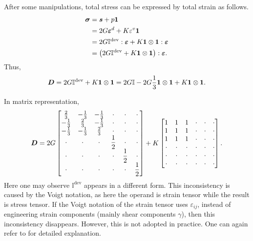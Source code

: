 After some manipulations, total stress can be expressed by total strain as follows.
\begin{gather}
\begin{split}
\bm{\sigma}&=\bm{s}+p\bm{1}\\
&=2G\bm{\varepsilon}^d+K\varepsilon^v\bm{1}\\
&=2G\mathbb{I}^\text{dev}:\bm{\varepsilon}+K\bm{1}\otimes\bm{1}:\bm{\varepsilon}\\
&=\left(2G\mathbb{I}^\text{dev}+K\bm{1}\otimes\bm{1}\right):\bm{\varepsilon}.
\end{split}
\end{gather}
Thus,
\begin{gather}
\bm{D}=2G\mathbb{I}^\text{dev}+K\bm{1}\otimes\bm{1}=2G\mathbb{I}-2G\dfrac{1}{3}\bm{1}\otimes\bm{1}+K\bm{1}\otimes\bm{1}.
\end{gather}

In matrix representation,
\begin{gather}
\bm{D}=2G\begin{bmatrix}
\frac{2}{3}&-\frac{1}{3}&-\frac{1}{3}&\cdot&\cdot&\cdot\\
-\frac{1}{3}&\frac{2}{3}&-\frac{1}{3}&\cdot&\cdot&\cdot\\
-\frac{1}{3}&-\frac{1}{3}&\frac{2}{3}&\cdot&\cdot&\cdot\\
\cdot&\cdot&\cdot&\dfrac{1}{2}&\cdot&\cdot\\
\cdot&\cdot&\cdot&\cdot&\dfrac{1}{2}&\cdot\\
\cdot&\cdot&\cdot&\cdot&\cdot&\dfrac{1}{2}
\end{bmatrix}+K\begin{bmatrix}
1&1&1&\cdot&\cdot&\cdot\\
1&1&1&\cdot&\cdot&\cdot\\
1&1&1&\cdot&\cdot&\cdot\\
\cdot&\cdot&\cdot&\cdot&\cdot&\cdot\\
\cdot&\cdot&\cdot&\cdot&\cdot&\cdot\\
\cdot&\cdot&\cdot&\cdot&\cdot&\cdot
\end{bmatrix}.
\end{gather}
Here one may observe $\mathbb{I}^\text{dev}$ appears in a different form.
This inconsistency is caused by the Voigt notation, as here the operand is strain tensor while the result is stress tensor.
If the Voigt notation of the strain tensor uses $\varepsilon_{ij}$, instead of engineering strain components (mainly shear components $\gamma$), then this inconsistency disappears.
However, this is not adopted in practice.
One can again refer to \cite{Helnwein2001} for detailed explanation.

